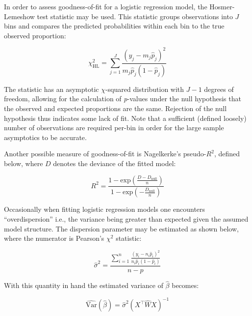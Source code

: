 \documentclass{report}
\begin{document}
In order to assess goodness-of-fit for a logistic regression model, the Hosmer-Lemeshow test statistic may be used. This statistic groups observations into $J$ bins and compares the predicted probabilities within each bin to the true observed proportion:

\begin{equation}\label{eq:glm-logistic-hosmer-lemeshow-statistic}
    \chi^2_{\text{HL}} = \sum_{j=1}^J \frac{\left(y_j - m_j\hat{p}_j\right)^2}{m_j\hat{p}_j\left(1-\hat{p}_j\right)}
\end{equation}

The statistic has an asymptotic $\chi$-squared distribution with $J - 1$ degrees of freedom, allowing for the calculation of \textit{p}-values under the null hypothesis that the observed and expected proportions are the same. Rejection of the null hypothesis thus indicates some lack of fit. Note that a sufficient (defined loosely) number of observations are required per-bin in order for the large sample asymptotics to be accurate. 

Another possible measure of goodness-of-fit is Nagelkerke's pseudo-$R^2$, defined below, where $D$ denotes the deviance of the fitted model:

\begin{equation}\label{eq:glm-logistic-r-squared-nagelkerke}
    R^2 = \frac{1 - \text{exp}\left(\frac{D - D_{\text{null}}}{n}\right)}{1 - \text{exp}\left(-\frac{D_{\text{null}}}{n}\right)}
\end{equation}

Occasionally when fitting logistic regression models one encounters ``overdispersion'' i.e., the variance being greater than expected given the assumed model structure. The dispersion parameter may be estimated as shown below, where the numerator is Pearson's $\chi^2$ statistic:

\begin{equation}\label{eq:glm-logistic-dispersion-estimator}
    \hat{\sigma}^2 = \frac{\sum_{i=1}^n \frac{\left(y_i - n_i\hat{p}_i\right)^2}{n_i\hat{p}_i\left(1-\hat{p}_i\right)}}{n-p}
\end{equation}

With this quantity in hand the estimated variance of $\hat{\beta}$ becomes:

\begin{equation}\label{eq:glm-logistic-dispersion-corrected-beta-variance}
    \widehat{\text{Var}}\left(\hat{\beta}\right) = \hat{\sigma}^2\left(X^\intercal \hat{W} X\right)^{-1}
\end{equation}
\end{document}
